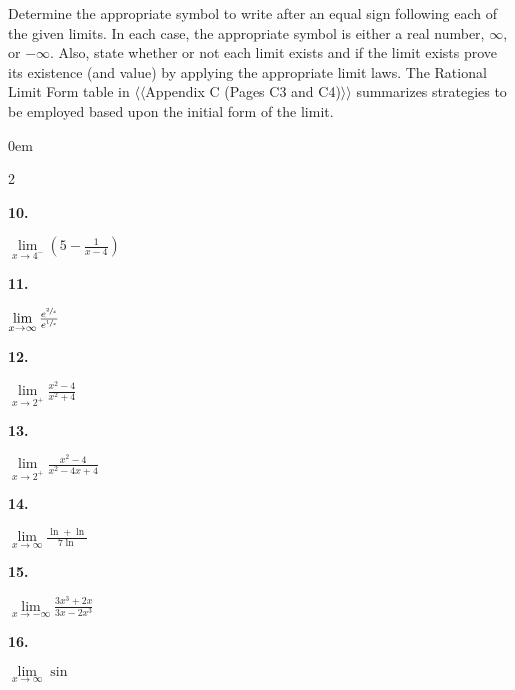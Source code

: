 \documentclass[12pt,]{book}
\theoremstyle{plain}
\theoremstyle{definition}
\numberwithin{equation}{section}
\newenvironment{exercisegroup}%
{\medskip\noindent}%
{\par\bigskip}%
\newlength{\exercisegroupindent}%
\newlength{\exercisegroupitemwidth}%
\newenvironment{exercisegrouplist}%
{\vspace{-\partopsep}%
\begin{adjustwidth}{\exercisegroupindent}{0em}}%
{\end{adjustwidth}%
\vspace{-\partopsep}%
\vspace{\baselineskip}}%
\newenvironment{exercisegroupbycol}[1]%
{\begin{exercisegrouplist}%
\vspace{-\multicolsep}%
\begin{multicols}{#1}%
\setlength{\parindent}{0em}%
\setlength{\exercisegroupitemwidth}{\linewidth}}%
{\end{multicols}%
\vspace{-\multicolsep}%
\end{exercisegrouplist}}%
\newenvironment{exercisegroupitem}[1]%
{\begin{minipage}[t]{\exercisegroupitemwidth}
\vspace{0pt}%
{\bfseries#1}%
\rule{0pt}{\baselineskip}}{\strut%
\end{minipage}%
\hspace{\columnsep}}%
\providecommand\phantomsection{}
\newcommand{\fe}[2]{\mathop{{#1}{\left(#2\right)}}}
\begin{document}
\begin{exercisegroup}%
Determine the appropriate symbol to write after an equal sign following each of the given limits.  In each case, the appropriate symbol is either a real number, \(\infty\), or \(-\infty\).  Also, state whether or not each limit exists and if the limit exists prove its existence (and value) by applying the appropriate limit laws.  The Rational Limit Form table in {$\langle\langle$Appendix C (Pages C3 and C4)$\rangle\rangle$} summarizes strategies to be employed based upon the initial form of the limit.%
\par
\begin{exercisegroupbycol}{2}%
\begin{exercisegroupitem}{10. }\phantomsection\hypertarget{exercise-147}{\null}
\(\lim\limits_{x\to4^{-}}\left(5-\frac{1}{x-4}\right)\)%
\end{exercisegroupitem}%
\par%
\begin{exercisegroupitem}{11. }\phantomsection\hypertarget{exercise-148}{\null}
\(\lim\limits_{x\to\infty}\frac{e^{\sfrac{2}{x}}}{e^{\sfrac{1}{x}}}\)%
\end{exercisegroupitem}%
\par%
\begin{exercisegroupitem}{12. }\phantomsection\hypertarget{exercise-149}{\null}
\(\lim\limits_{x\to2^{+}}\frac{x^2-4}{x^2+4}\)%
\end{exercisegroupitem}%
\par%
\begin{exercisegroupitem}{13. }\phantomsection\hypertarget{exercise-150}{\null}
\(\lim\limits_{x\to2^{+}}\frac{x^2-4}{x^2-4x+4}\)%
\end{exercisegroupitem}%
\par%
\begin{exercisegroupitem}{14. }\phantomsection\hypertarget{exercise-151}{\null}
\(\lim\limits_{x\to\infty}\frac{\fe{\ln}{x}+\fe{\ln}{x^6}}{7\fe{\ln}{x^2}}\)%
\end{exercisegroupitem}%
\par%
\begin{exercisegroupitem}{15. }\phantomsection\hypertarget{exercise-152}{\null}
\(\lim\limits_{x\to-\infty}\frac{3x^3+2x}{3x-2x^3}\)%
\end{exercisegroupitem}%
\par%
\begin{exercisegroupitem}{16. }\phantomsection\hypertarget{exercise-153}{\null}
\(\lim\limits_{x\to\infty}\fe{\sin}{\frac{\pi e^{3x}}{2e^x+4e^{3x}}}\)%

\end{exercisegroupitem}
\end{exercisegroupbycol}
\end{exercisegroup}
\end{document}
